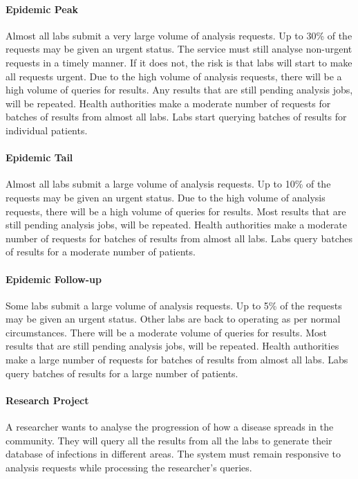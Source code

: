 \documentclass{csse4400}
\begin{document}
\paragraph{Epidemic Peak}
Almost all labs submit a very large volume of analysis requests.
Up to 30\% of the requests may be given an urgent status.
The service must still analyse non-urgent requests in a timely manner.
If it does not, the risk is that labs will start to make all requests urgent.
Due to the high volume of analysis requests, there will be a high volume of queries for results.
Any results that are still pending analysis jobs, will be repeated.
Health authorities make a moderate number of requests for batches of results from almost all labs.
Labs start querying batches of results for individual patients.

\paragraph{Epidemic Tail}
Almost all labs submit a large volume of analysis requests.
Up to 10\% of the requests may be given an urgent status.
Due to the high volume of analysis requests, there will be a high volume of queries for results.
Most results that are still pending analysis jobs, will be repeated.
Health authorities make a moderate number of requests for batches of results from almost all labs.
Labs query batches of results for a moderate number of patients.

\paragraph{Epidemic Follow-up}
Some labs submit a large volume of analysis requests.
Up to 5\% of the requests may be given an urgent status.
Other labs are back to operating as per normal circumstances.
There will be a moderate volume of queries for results.
Most results that are still pending analysis jobs, will be repeated.
Health authorities make a large number of requests for batches of results from almost all labs.
Labs query batches of results for a large number of patients.

\paragraph{Research Project}
A researcher wants to analyse the progression of how a disease spreads in the community.
They will query all the results from all the labs to generate their database of infections in different areas.
The system must remain responsive to analysis requests while processing the researcher's queries.
\end{document}
